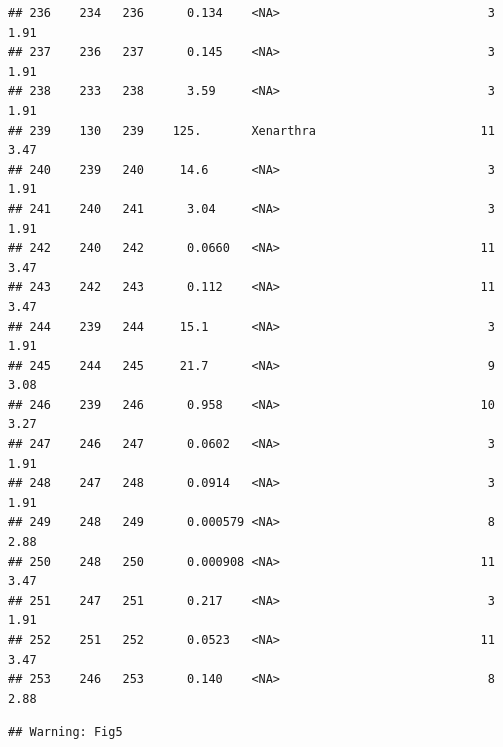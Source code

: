 \documentclass[10pt,letterpaper]{article}
\begin{document}
\begin{verbatim}
## 236    234   236      0.134    <NA>                             3    1.91 
## 237    236   237      0.145    <NA>                             3    1.91 
## 238    233   238      3.59     <NA>                             3    1.91 
## 239    130   239    125.       Xenarthra                       11    3.47 
## 240    239   240     14.6      <NA>                             3    1.91 
## 241    240   241      3.04     <NA>                             3    1.91 
## 242    240   242      0.0660   <NA>                            11    3.47 
## 243    242   243      0.112    <NA>                            11    3.47 
## 244    239   244     15.1      <NA>                             3    1.91 
## 245    244   245     21.7      <NA>                             9    3.08 
## 246    239   246      0.958    <NA>                            10    3.27 
## 247    246   247      0.0602   <NA>                             3    1.91 
## 248    247   248      0.0914   <NA>                             3    1.91 
## 249    248   249      0.000579 <NA>                             8    2.88 
## 250    248   250      0.000908 <NA>                            11    3.47 
## 251    247   251      0.217    <NA>                             3    1.91 
## 252    251   252      0.0523   <NA>                            11    3.47 
## 253    246   253      0.140    <NA>                             8    2.88
\end{verbatim}

\begin{verbatim}
## Warning: Fig5
\end{verbatim}
\end{document}
